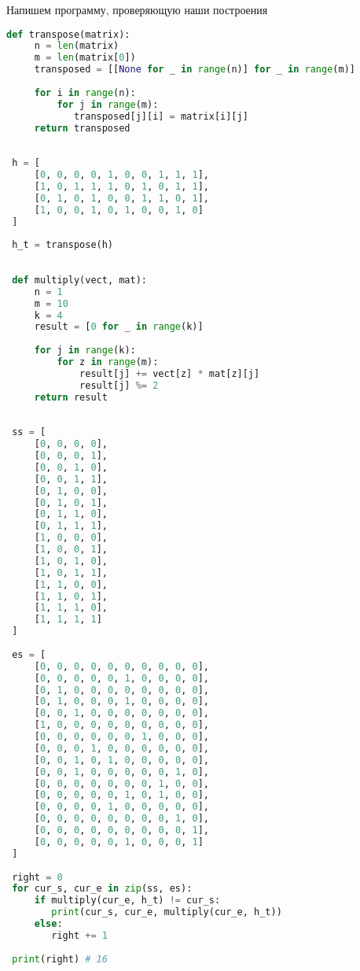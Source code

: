 \documentclass{article}
\begin{document}
 Напишем программу, проверяющую наши построения
 \begin{lstlisting}[language=python]
 def transpose(matrix):
	 n = len(matrix)
	 m = len(matrix[0])
	 transposed = [[None for _ in range(n)] for _ in range(m)]
 
	 for i in range(n):
		 for j in range(m):
		 	transposed[j][i] = matrix[i][j]
	 return transposed
 
 
 h = [
	 [0, 0, 0, 0, 1, 0, 0, 1, 1, 1],
	 [1, 0, 1, 1, 1, 0, 1, 0, 1, 1],
	 [0, 1, 0, 1, 0, 0, 1, 1, 0, 1],
	 [1, 0, 0, 1, 0, 1, 0, 0, 1, 0]
 ]
 
 h_t = transpose(h)
 
 
 def multiply(vect, mat):
	 n = 1
	 m = 10
	 k = 4
	 result = [0 for _ in range(k)]
	 
	 for j in range(k):
		 for z in range(m):
			 result[j] += vect[z] * mat[z][j]
			 result[j] %= 2
	 return result
 
 
 ss = [
	 [0, 0, 0, 0],
	 [0, 0, 0, 1],
	 [0, 0, 1, 0],
	 [0, 0, 1, 1],
	 [0, 1, 0, 0],
	 [0, 1, 0, 1],
	 [0, 1, 1, 0],
	 [0, 1, 1, 1],
	 [1, 0, 0, 0],
	 [1, 0, 0, 1],
	 [1, 0, 1, 0],
	 [1, 0, 1, 1],
	 [1, 1, 0, 0],
	 [1, 1, 0, 1],
	 [1, 1, 1, 0],
	 [1, 1, 1, 1]
 ]
 
 es = [
	 [0, 0, 0, 0, 0, 0, 0, 0, 0, 0],
	 [0, 0, 0, 0, 0, 1, 0, 0, 0, 0],
	 [0, 1, 0, 0, 0, 0, 0, 0, 0, 0],
	 [0, 1, 0, 0, 0, 1, 0, 0, 0, 0],
	 [0, 0, 1, 0, 0, 0, 0, 0, 0, 0],
	 [1, 0, 0, 0, 0, 0, 0, 0, 0, 0],
	 [0, 0, 0, 0, 0, 0, 1, 0, 0, 0],
	 [0, 0, 0, 1, 0, 0, 0, 0, 0, 0],
	 [0, 0, 1, 0, 1, 0, 0, 0, 0, 0],
	 [0, 0, 1, 0, 0, 0, 0, 0, 1, 0],
	 [0, 0, 0, 0, 0, 0, 0, 1, 0, 0],
	 [0, 0, 0, 0, 0, 1, 0, 1, 0, 0],
	 [0, 0, 0, 0, 1, 0, 0, 0, 0, 0],
	 [0, 0, 0, 0, 0, 0, 0, 0, 1, 0],
	 [0, 0, 0, 0, 0, 0, 0, 0, 0, 1],
	 [0, 0, 0, 0, 0, 1, 0, 0, 0, 1]
 ]
 
 right = 0
 for cur_s, cur_e in zip(ss, es):
	 if multiply(cur_e, h_t) != cur_s:
	 	print(cur_s, cur_e, multiply(cur_e, h_t))
	 else:
	 	right += 1
 
 print(right) # 16
 
 \end{lstlisting}
	 
\end{document}
